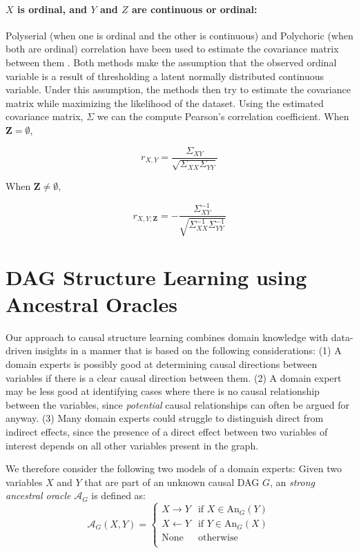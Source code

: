 \documentclass{uai2025} %
\begin{document}
\paragraph{$ X $ is ordinal, and $ Y $ and $ Z $  are continuous or ordinal: }

Polyserial (when one is ordinal and the other is continuous) and Polychoric
(when both are ordinal) correlation have been used to estimate the covariance
matrix between them \citep{Poon1987}. Both methods make the assumption that the
observed ordinal variable is a result of thresholding a latent normally
distributed continuous variable. Under this assumption, the methods then try to
estimate the covariance matrix while maximizing the likelihood of the dataset.
Using the estimated covariance matrix, $ \Sigma $ we can the compute Pearson's
correlation coefficient. When $ \bm{Z} = \emptyset $,

\begin{equation}
	r_{X, Y} = \frac{\Sigma_{XY}}{\sqrt{\Sigma_{XX} \Sigma_{YY}}}
\end{equation}

When $ \bm{Z} \neq \emptyset $, 

\begin{equation}
	r_{X, Y; \bm{Z}} = - \frac{\Sigma^{-1}_{XY}}{\sqrt{\Sigma^{-1}_{XX} \Sigma^{-1}_{YY}}}
\end{equation}


\section{DAG Structure Learning using Ancestral Oracles}
\label{sec:modification}

Our approach to causal structure learning combines domain knowledge with data-driven
insights in a manner that is based on the following considerations: 
(1) A domain experts is possibly good at determining causal directions between variables if 
there is a clear causal direction between them. (2) A domain expert may be less good
at identifying cases where there is no causal relationship between the variables,
since \emph{potential} causal relationships can often be argued for anyway.
(3) Many domain experts could struggle to distinguish direct from indirect 
effects, since the presence of a direct effect between two variables
of interest depends on all other variables present in the graph. 

We therefore consider the following two models of a domain experts: Given two variables
$ X $ and $ Y $ that are part of an unknown causal DAG $G$, an \emph{strong ancestral oracle} 
$\mathcal{A}_G$ is defined as:
$$\mathcal{A}_G(X,Y)=\begin{cases}
 X \to Y & \textrm{if } X \in \textrm{An}_G(Y) \\
 X \gets Y & \textrm{if } Y \in \textrm{An}_G(X) \\
 \textrm{None} & \textrm{otherwise} \\
\end{cases}$$
\end{document}
